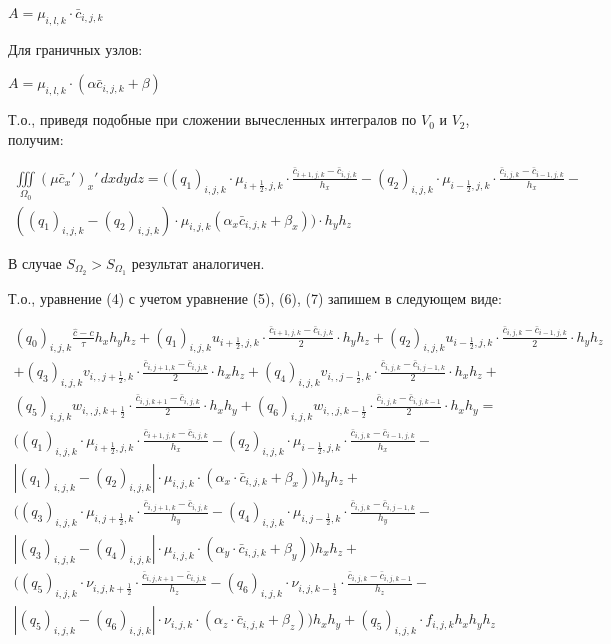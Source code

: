\documentclass[12pt]{article}
\begin{document}
 $A=\mu_{i,l,k}\cdot\bar{c}_{i,j,k}$

Для граничных узлов:

 $A=\mu_{i,l,k}\cdot( \alpha\bar{c}_{i,j,k}+\beta)$


Т.о., приведя подобные при сложении вычесленных интегралов по $V_0$ и $V_2$, получим:

\begin{multline} 
	\iiint\limits_{\Omega_0} (\mu\bar{c}_x')_x'\,dxdydz =    ((q_1)_{i,j,k}\cdot\mu_{i+\frac{1}{2},j,k}\cdot\frac{\bar{c}_{i+1,j,k}-\bar{c}_{i,j,k}}{h_x} - (q_2)_{i,j,k}\cdot\mu_{i-\frac{1}{2},j,k}\cdot\frac{\bar{c}_{i,j,k}-\bar{c}_{i-1,j,k}}{h_x} -     \\
	((q_1)_{i,j,k}-(q_2)_{i,j,k})\cdot\mu_{i,j,k}(\alpha_x\bar{c}_{i,j,k} + 
	\beta_x) )\cdot h_yh_z   
\end{multline} 

В случае $S_{\Omega_2}>S_{\Omega_1}$ результат аналогичен.

Т.о., уравнение  (4) с учетом уравнение (5), (6), (7) запишем в следующем виде:

\begin{multline} 
	(q_0)_{i,j,k}\frac{\hat{c}-c}{\tau}h_xh_yh_z + (q_1)_{i,j,k}u_{i+\frac{1}{2},j,k} \cdot\frac{\bar{c}_{i+1,j,k}-\bar{c}_{i,j,k}}{2}\cdot h_yh_z + (q_2)_{i,j,k}u_{i-\frac{1}{2},j,k}\cdot\frac{\bar{c}_{i,j,k}-\bar{c}_{i-1,j,k}}{2}\cdot h_yh_z \\
	+ (q_3)_{i,j,k}v_{i,,j+\frac{1}{2},k}\cdot\frac{\bar{c}_{i,j+1,k}-\bar{c}_{i,j,k}}{2}\cdot h_xh_z + 
	(q_4)_{i,j,k}v_{i,,j-\frac{1}{2},k}\cdot\frac{\bar{c}_{i,j,k}-\bar{c}_{i,j-1,k}}{2}\cdot h_xh_z + \\
	(q_5)_{i,j,k}w_{i,,j,k+\frac{1}{2}}\cdot\frac{\bar{c}_{i,j,k+1}-\bar{c}_{i,j,k}}{2}\cdot h_xh_y + 
	(q_6)_{i,j,k}w_{i,,j,k-\frac{1}{2}}\cdot\frac{\bar{c}_{i,j,k}-\bar{c}_{i,j,k-1}}{2}\cdot h_xh_y = \\
	((q_1)_{i,j,k}\cdot\mu_{i+\frac{1}{2},j,k}\cdot \frac{\bar{c}_{i+1,j,k}-\bar{c}_{i,j,k}}{h_x} -  (q_2)_{i,j,k}\cdot\mu_{i-\frac{1}{2},j,k}\cdot \frac{\bar{c}_{i,j,k}-\bar{c}_{i-1,j,k}}{h_x} - \\
	 |(q_1)_{i,j,k}-(q_2)_{i,j,k}|\cdot\mu_{i,j,k}\cdot(\alpha_x\cdot\bar{c}_{i,j,k}+\beta_x))h_yh_z + \\
	 ((q_3)_{i,j,k}\cdot\mu_{i,j+\frac{1}{2},k}\cdot \frac{\bar{c}_{i,j+1,k}-\bar{c}_{i,j,k}}{h_y} -  (q_4)_{i,j,k}\cdot\mu_{i,j-\frac{1}{2},k}\cdot \frac{\bar{c}_{i,j,k}-\bar{c}_{i,j-1,k}}{h_y} - \\
	 |(q_3)_{i,j,k}-(q_4)_{i,j,k}|\cdot\mu_{i,j,k}\cdot(\alpha_y\cdot\bar{c}_{i,j,k}+\beta_y))h_xh_z + \\
	 ((q_5)_{i,j,k}\cdot\nu_{i,j,k+\frac{1}{2}}\cdot \frac{\bar{c}_{i,j,k+1}-\bar{c}_{i,j,k}}{h_z} -  (q_6)_{i,j,k}\cdot\nu_{i,j,k-\frac{1}{2}}\cdot \frac{\bar{c}_{i,j,k}-\bar{c}_{i,j,k-1}}{h_z} - \\
	 |(q_5)_{i,j,k}-(q_6)_{i,j,k}|\cdot\nu_{i,j,k}\cdot(\alpha_z\cdot\bar{c}_{i,j,k}+\beta_z))h_xh_y + (q_5)_{i,j,k}\cdot f_{i,j,k}h_xh_yh_z
\end{multline} 
\end{document}
